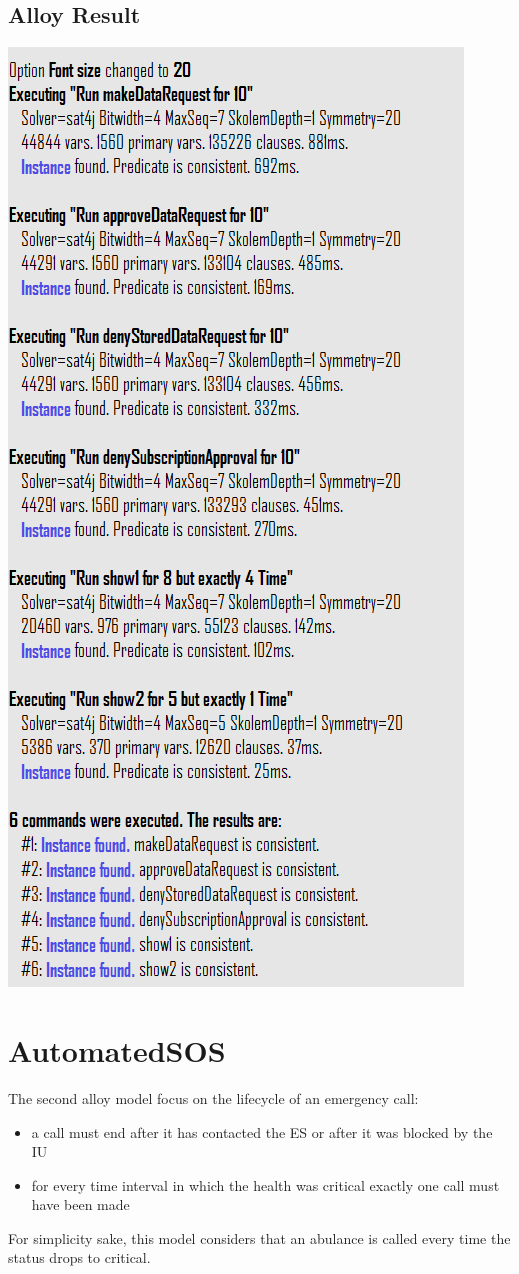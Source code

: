 \subsection{Alloy Result}
\includegraphics[height = 0.8\textheight]{sections/alloy/resultD4H.png}
\clearpage
\section{AutomatedSOS}
The second alloy model focus on the lifecycle of an emergency call:
\begin{itemize}
\item a call must end after it has contacted the ES or after it was blocked by the IU
\item for every time interval in which the health was critical exactly one call must have been made
\end{itemize}
For simplicity sake, this model considers that an abulance is called every time the status drops to critical.
